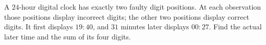 A $24$-hour digital clock has exactly two faulty digit positions. At each observation those positions display incorrect digits; the other two positions display correct digits. It first displays $19{:}40$, and $31$ minutes later displays $00{:}27$. Find the actual later time and the sum of its four digits.
